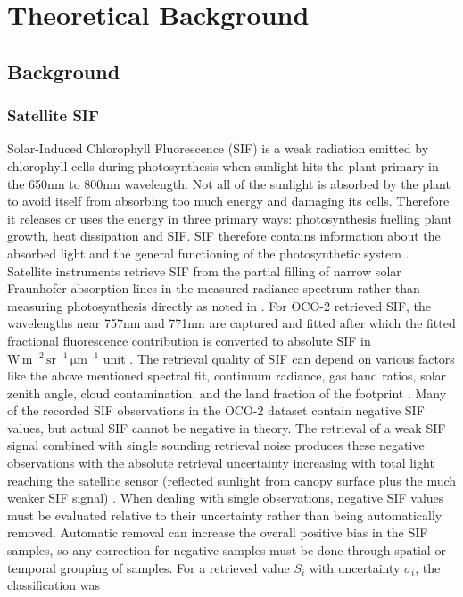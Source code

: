 \chapter{Theoretical Background\label{cha:chapter2}}


\section{Background \label{sec:background}}

\subsection{Satellite SIF}

Solar-Induced Chlorophyll Fluorescence (SIF) is a weak radiation emitted by chlorophyll cells during photosynthesis when sunlight hits the plant primary in the 650nm to 800nm wavelength. Not all of the sunlight is absorbed by the plant to avoid itself from absorbing too much energy and damaging its cells. Therefore it releases or uses the energy in three primary ways: photosynthesis fuelling plant growth, heat dissipation and SIF. SIF therefore contains information about the absorbed light and the general functioning of the photosynthetic system \cite{doughty2022global,porcar2014linking}. Satellite instruments retrieve SIF from the partial filling of narrow solar Fraunhofer absorption lines in the measured radiance spectrum rather than measuring photosynthesis directly as noted in \cite{sun2018overview,doughty2022global}. For OCO-2 retrieved SIF, the wavelengths near 757nm and 771nm are captured and fitted after which the fitted fractional fluorescence contribution is converted to absolute SIF in \(\mathrm{W\,m^{-2}\,sr^{-1}\,\mu\mathrm{m}^{-1}}\) unit \cite{doughty2022global}. The retrieval quality of SIF can depend on various factors like the above mentioned spectral fit, continuum radiance, gas band ratios, solar zenith angle, cloud contamination, and the land fraction of the footprint \cite{doughty2022global}. Many of the recorded SIF observations in the OCO-2 dataset contain negative SIF values, but actual SIF cannot be negative in theory. The retrieval of a weak SIF signal combined with single sounding retrieval noise produces these negative observations with the absolute retrieval uncertainty increasing with total light reaching the satellite sensor (reflected sunlight from canopy surface plus the much weaker SIF signal) \cite{kohler2018global}. When dealing with single observations, negative SIF values must be evaluated relative to their uncertainty rather than being automatically removed. Automatic removal can increase the overall positive bias in the SIF samples, so any correction for negative samples must be done through spatial or temporal grouping of samples. For a retrieved value \(S_i\) with uncertainty \(\sigma_i\), the classification was


